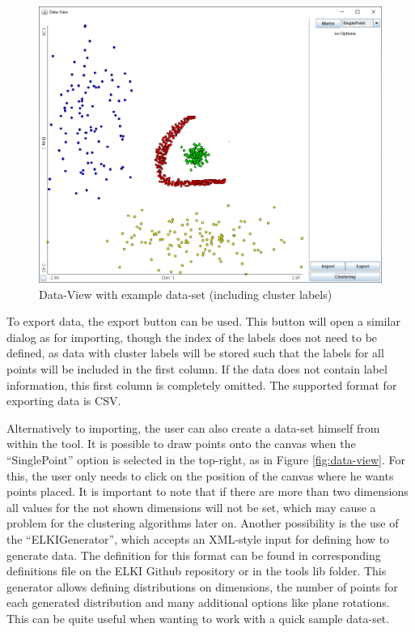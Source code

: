 \documentclass[
	a4paper,
	english,
	twoside,
	openright,               
	11pt                            
	]{report}
\begin{document}
\begin{figure}[H]
	\centering
	\includegraphics[scale=.45]{unob}
	\caption{Data-View with example data-set (including cluster labels)}
	\label{fig:loaded-data}
\end{figure}

To export data, the export button can be used. This button will open a similar dialog as for importing, though the index of the labels does not need to be defined, as data with cluster labels will be stored such that the labels for all points will be included in the first column. If the data does not contain label information, this first column is completely omitted. The supported format for exporting data is CSV.

Alternatively to importing, the user can also create a data-set himself from within the tool. It is possible to draw points onto the canvas when the ``SinglePoint'' option is selected in the top-right, as in Figure \ref{fig:data-view}. For this, the user only needs to click on the position of the canvas where he wants points placed. It is important to note that if there are more than two dimensions all values for the not shown dimensions will not be set, which may cause a problem for the clustering algorithms later on. Another possibility is the use of the ``ELKIGenerator'', which accepts an XML-style input for defining how to generate data. The definition for this format can be found in corresponding definitions file on the ELKI Github repository \cite{elkixml} or in the tools lib folder. This generator allows defining distributions on dimensions, the number of points for each generated distribution and many additional options like plane rotations. This can be quite useful when wanting to work with a quick sample data-set. 
\end{document}
